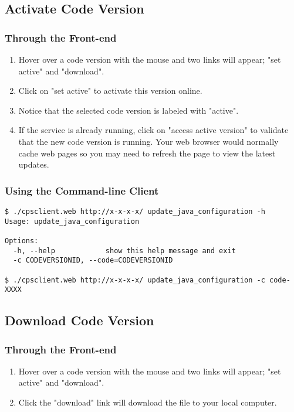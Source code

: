 \documentclass[10pt]{article}
\newenvironment{framedbox}[1]%
{\begin{framed}
 \begingroup
 \fontsize{#1}{#1}\selectfont
}
{
 \endgroup
 \end{framed}
}
\begin{document}
\subsection{Activate Code Version}
\subsubsection{Through the Front-end}
\begin{enumerate}
\item Hover over a code version with the mouse and two links will appear;
      "set active" and "download".
\item Click on "set active" to activate this version online.
\item Notice that the selected code version is labeled with "active".
\item If the service is already running, click on "access active version" to
      validate that the new code version is running. Your web browser would
      normally cache web pages so you may need to refresh the page to view
      the latest updates.
\end{enumerate}

\subsubsection{Using the Command-line Client}
\begin{framedbox}{8pt}\begin{verbatim}
$ ./cpsclient.web http://x-x-x-x/ update_java_configuration -h
Usage: update_java_configuration

Options:
  -h, --help            show this help message and exit
  -c CODEVERSIONID, --code=CODEVERSIONID

$ ./cpsclient.web http://x-x-x-x/ update_java_configuration -c code-XXXX
\end{verbatim}\end{framedbox}

\subsection{Download Code Version}
\subsubsection{Through the Front-end}
\begin{enumerate}
\item Hover over a code version with the mouse and two links will appear;
      "set active" and "download".
\item Click the "download" link will download the file to your local computer.
\end{enumerate}
\end{document}
